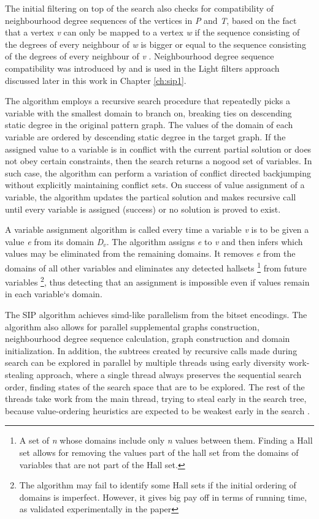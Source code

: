 \documentclass{l4proj}
\begin{document}
The initial filtering on top of the search also checks for compatibility of neighbourhood degree sequences of the vertices in \emph{P} and \emph{T}, based on the fact that a vertex \emph{v} can only be mapped to a vertex \emph{w} if the sequence consisting of the degrees of every neighbour of \emph{w} is bigger or equal to the sequence consisting of the degrees of every neighbour of \emph{v} \cite{Solnon:2010}. Neighbourhood degree sequence compatibility was introduced by \cite{Solnon:2010} and is used in the Light filters approach discussed later in this work in Chapter \ref{ch:sip1}. 

The algorithm employs a recursive search procedure that repeatedly picks a variable with the smallest domain to branch on, breaking ties on descending static degree in the original pattern graph. The values of the domain of each variable are ordered by descending static degree in the target graph. If the assigned value to a variable is in conflict with the current partial solution or does not obey certain constraints, then the search returns a nogood set of variables. In such case, the algorithm can perform a variation of conflict directed backjumping \cite{Prosser:1993} without explicitly maintaining conflict sets. On success of value assignment of a variable, the algorithm updates the partical solution and makes recursive call until every variable is assigned (success) or no solution is proved to exist. 

A variable assignment algorithm is called every time a variable \emph{v} is to be given a value \emph{e} from its domain \emph{D$_{v}$}. The algorithm assigns \emph{e} to \emph{v} and then infers which values may be eliminated from the remaining domains. It removes \emph{e} from the domains of all other variables and eliminates any detected \glspl{hallset} \footnote{A set of \emph{n} whose domains include only \emph{n} values between them. Finding a Hall set allows for removing the values part of the hall set from the domains of variables that are not part of the Hall set.} from future variables \footnote{The algorithm may fail to identify some Hall sets if the initial ordering of domains is imperfect. However, it gives big pay off in terms of running time, as validated experimentally in the paper}, thus detecting that an assignment is impossible even if values remain in each variable`s domain.

The SIP algorithm achieves \gls{simd}-like parallelism from the bitset encodings. The algorithm also allows for parallel supplemental graphs construction, neighbourhood degree sequence calculation, graph construction and domain initialization. In addition, the subtrees created by recursive calls made during search can be explored in parallel by multiple threads using early diversity work-stealing approach, where a single thread always preserves the sequential search order, finding states of the search space that are to be explored. The rest of the threads take work from the main thread, trying to steal early in the search tree, because value-ordering heuristics are expected to be weakest early in the search \cite{Harvey:1995}.
\end{document}
